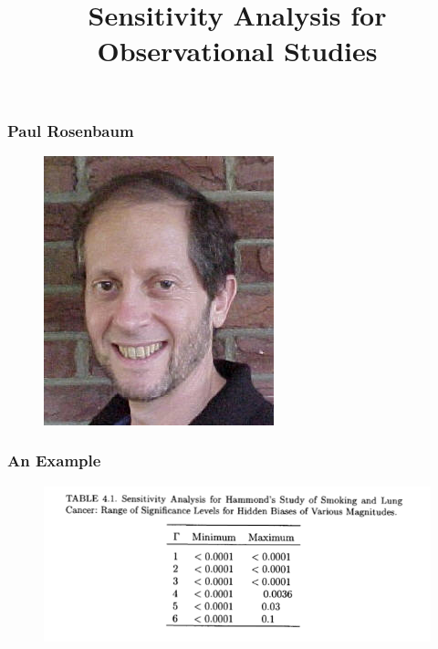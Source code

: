 \documentclass{beamer}
\title{Sensitivity Analysis for Observational Studies}
\begin{document}
\frame{\titlepage}


\begin{frame}
  \frametitle{Paul Rosenbaum}
  \begin{figure}[t]
    \centering
      \includegraphics[scale=.8]{rosenbaum.jpg}
 \end{figure}
\end{frame}




\begin{frame}
  \frametitle{An Example}
  \begin{figure}[t]
  \centering
  \includegraphics[scale=.6]{smoking_sensitivity.png}
\end{figure}
\end{frame}

\end{document}
